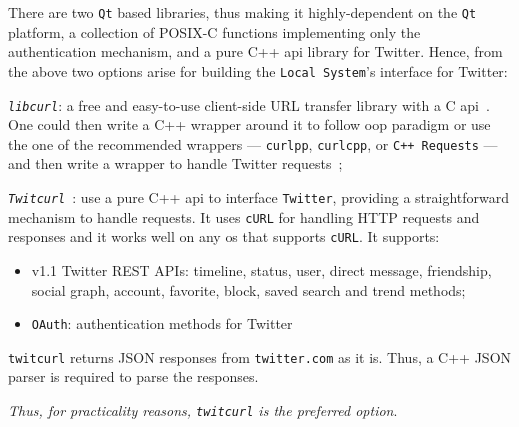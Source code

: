 There are two \texttt{Qt} based libraries, thus making it
highly-dependent on the \texttt{Qt} platform, a collection of POSIX-C functions
implementing only the authentication mechanism, and a pure C++ \gls{api} library
for Twitter. Hence, from the above two options arise for building the
\texttt{Local System}'s interface for Twitter:
\begin{enum-c}
\item \emph{\texttt{libcurl}}: a free and easy-to-use client-side URL transfer library
  with a C \gls{api}~\cite{libcurl}. One could then write a C++ wrapper around it to follow
  \gls{oop} paradigm or use the one of the recommended wrappers ---
  \texttt{curlpp}, \texttt{curlcpp}, or \texttt{C++ Requests} --- and then write
  a wrapper to handle Twitter requests~\cite{libcurlBindings};
\item \emph{\texttt{Twitcurl}}~\cite{twitcurlGithub}: use a pure C++ \gls{api} to interface \texttt{Twitter},
  providing a straightforward mechanism to handle requests. It uses
  \texttt{cURL} for handling HTTP requests and responses and it works well on
  any \gls{os} that supports \texttt{cURL}. It supports:
  \begin{itemize}
  \item v1.1 Twitter REST APIs: timeline, status, user, direct message,
    friendship, social graph, account, favorite, block, saved search and trend
    methods;
  \item \texttt{OAuth}: authentication methods for Twitter
  \end{itemize}
  \texttt{twitcurl} returns JSON responses from \texttt{twitter.com} as it
  is. Thus, a C++ JSON parser is required to parse the responses.
\end{enum-c}

\emph{Thus, for practicality reasons, \texttt{twitcurl} is the preferred option}.